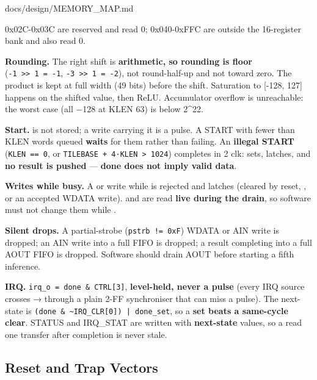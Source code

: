 \begin{relocated}{docs/design/MEMORY_MAP.md}
{}

0x02C-0x03C are reserved and read 0; 0x040-0xFFC are outside the
16-register bank and also read 0.

\textbf{Rounding.} The right shift is \textbf{arithmetic, so rounding is
floor}
(\texttt{-\allowbreak{}1\ >>\ 1\ =\allowbreak{}\ -\allowbreak{}1},
\texttt{-\allowbreak{}3\ >>\ 1\ =\allowbreak{}\ -\allowbreak{}2}), not
round-half-up and not toward zero. The product is kept at full width (49
bits) before the shift. Saturation to {[}-128, 127{]} happens on the
shifted value, then ReLU. Accumulator overflow is unreachable: the worst
case (all −128 at KLEN 63) is below 2\^{}22.

\textbf{Start.}  is not stored; a write carrying it is a
pulse. A START with fewer than KLEN  words queued
\textbf{waits} for them rather than failing. An \textbf{illegal START}
(\texttt{KLEN\ =\allowbreak{}=\allowbreak{}\ 0}, or
\texttt{TILEBASE\ +\allowbreak{}\ 4·KLEN\ >\ 1024}) completes in 2 clk:
 sets,  latches, and \textbf{no result is
pushed} --- \textbf{done does not imply valid data}.

\textbf{Writes while busy.} A  or  write while
 is rejected and latches  (cleared by
reset, , or an accepted WDATA write).  and
 are read \textbf{live during the drain}, so software must
not change them while .

\textbf{Silent drops.} A partial-strobe
(\texttt{pstrb\ !=\allowbreak{}\ 0xF}) WDATA or AIN write is dropped; an
AIN write into a full FIFO is dropped; a result completing into a full
AOUT FIFO is dropped. Software should drain AOUT before starting a fifth
inference.

\textbf{IRQ.}
\texttt{irq\_\allowbreak{}o\ =\allowbreak{}\ done\ \&\ CTRL[3]},
\textbf{level-held, never a pulse} (every IRQ source crosses
 →  through a plain 2-FF synchroniser
that can miss a pulse). The  next-state is
\texttt{(done\ \&\ \textasciitilde{}IRQ\_\allowbreak{}CLR[0])\ |\ done\_\allowbreak{}set},
so a \textbf{set beats a same-cycle clear}. STATUS and IRQ\_STAT are
written with \textbf{next-state} values, so a read one transfer after
completion is never stale.

\subsection{Reset and Trap Vectors}\label{ds:mm:memory-map:reset-and-trap-vectors}


\end{relocated}
